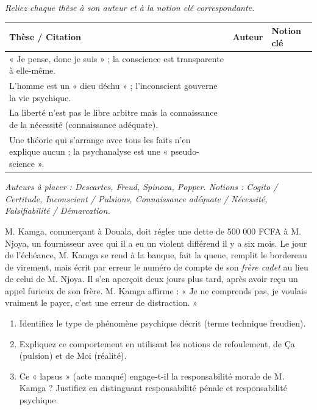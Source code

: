 \documentclass[11pt]{article}
\newcommand{\cle}[1]{{\popxbold\color{popdark}#1}}
\newcounter{popsec}
\newcounter{popsub}
\newcommand{\courssub}[1]{%
  \stepcounter{popsub}%
  \par\vspace{9pt}\noindent{\popxbold\fontsize{11.5}{13}\selectfont\color{popink}{\color{poporange}\thepopsec.\thepopsub}\hspace{6pt}#1}\par\nopagebreak\vspace{4pt}
}
\begin{document}
\begin{exercice}
\emph{Reliez chaque thèse à son auteur et à la notion clé correspondante.}
\begin{center}
\begin{tabularx}{\linewidth}{|l|X|X|}\hline
\textbf{Thèse / Citation} & \textbf{Auteur} & \textbf{Notion clé} \\ \hline
« Je pense, donc je suis » ; la conscience est transparente à elle-même. & & \\ \hline
L'homme est un « dieu déchu » ; l'inconscient gouverne la vie psychique. & & \\ \hline
La liberté n'est pas le libre arbitre mais la connaissance de la nécessité (connaissance adéquate). & & \\ \hline
Une théorie qui s'arrange avec tous les faits n'en explique aucun ; la psychanalyse est une « pseudo-science ». & & \\ \hline
\end{tabularx}
\end{center}
\emph{Auteurs à placer : Descartes, Freud, Spinoza, Popper. Notions : Cogito / Certitude, Inconscient / Pulsions, Connaissance adéquate / Nécessité, Falsifiabilité / Démarcation.}
\end{exercice}

\courssub{Je m'entraîne}

\begin{exercice}
M. Kamga, commerçant à Douala, doit régler une dette de 500 000 FCFA à M. Njoya, un fournisseur avec qui il a eu un violent différend il y a six mois. Le jour de l'échéance, M. Kamga se rend à la banque, fait la queue, remplit le bordereau de virement, mais écrit par erreur le numéro de compte de son \emph{frère cadet} au lieu de celui de M. Njoya. Il s'en aperçoit deux jours plus tard, après avoir reçu un appel furieux de son frère. M. Kamga affirme : « Je ne comprends pas, je voulais vraiment le payer, c'est une erreur de distraction. »
\begin{enumerate}
\item Identifiez le type de phénomène psychique décrit (terme technique freudien).
\item Expliquez ce comportement en utilisant les notions de \cle{refoulement}, de \cle{Ça} (pulsion) et de \cle{Moi} (réalité).
\item Ce « lapsus » (acte manqué) engage-t-il la responsabilité morale de M. Kamga ? Justifiez en distinguant \cle{responsabilité pénale} et \cle{responsabilité psychique}.
\end{enumerate}
\end{exercice}
\end{document}

